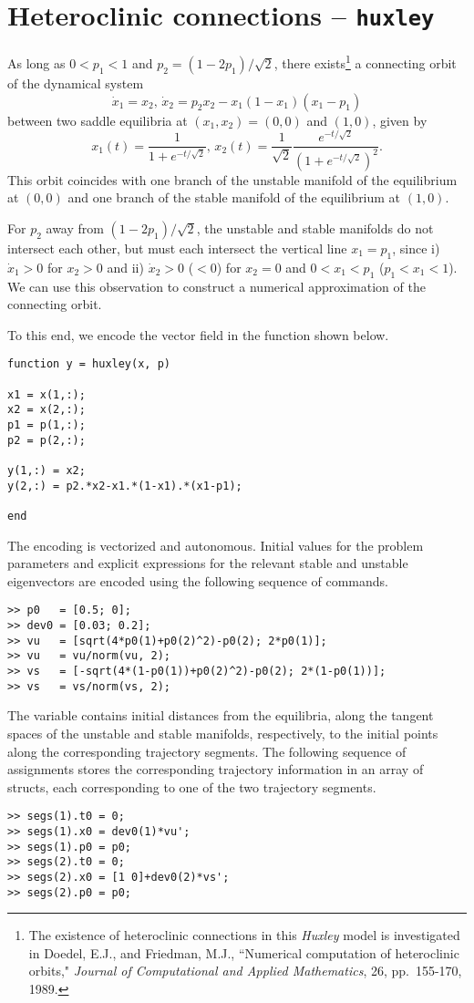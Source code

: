 \section{Heteroclinic connections -- \texttt{huxley}}
As long as $0<p_1<1$ and $p_2=(1-2p_1)/\sqrt{2}$, there exists\footnote{The existence of heteroclinic connections in this \emph{Huxley} model is investigated in Doedel, E.J., and Friedman, M.J., ``Numerical computation of heteroclinic orbits," \emph{Journal of Computational and Applied Mathematics}, 26, pp.~155-170, 1989.} a connecting orbit of the dynamical system
\begin{equation}
\dot{x}_1=x_2,\,\dot{x}_2=p_2 x_2-x_1(1-x_1)(x_1-p_1)
\end{equation}
between two saddle equilibria at $(x_1,x_2)=(0,0)$ and $(1,0)$, given by
\begin{equation}
x_1(t)=\frac{1}{1+e^{-t/\sqrt{2}}},\,x_2(t)=\frac{1}{\sqrt{2}}\frac{e^{-t/\sqrt{2}}}{(1+e^{-t/\sqrt{2}})^2}.
\end{equation}
This orbit coincides with one branch of the unstable manifold of the equilibrium at $(0,0)$ and one branch of the stable manifold of the equilibrium at $(1,0)$.

For $p_2$ away from $(1-2p_1)/\sqrt{2}$, the unstable and stable manifolds do not intersect each other, but must each intersect the vertical line $x_1=p_1$, since i) $\dot{x}_1>0$ for $x_2>0$ and ii) $\dot{x}_2>0$ ($<0$) for $x_2=0$ and $0<x_1<p_1$ ($p_1<x_1<1$). We can use this observation to construct a numerical approximation of the connecting orbit.

To this end, we encode the vector field in the function  shown below.
\begin{lstlisting}[language=coco-highlight]
function y = huxley(x, p)

x1 = x(1,:);
x2 = x(2,:);
p1 = p(1,:);
p2 = p(2,:);

y(1,:) = x2;
y(2,:) = p2.*x2-x1.*(1-x1).*(x1-p1);

end
\end{lstlisting}
The encoding is vectorized and autonomous. Initial values for the problem parameters and explicit expressions for the relevant stable and unstable eigenvectors are encoded using the following sequence of commands.
\begin{lstlisting}[language=coco-highlight]
>> p0   = [0.5; 0];
>> dev0 = [0.03; 0.2];
>> vu   = [sqrt(4*p0(1)+p0(2)^2)-p0(2); 2*p0(1)];
>> vu   = vu/norm(vu, 2);
>> vs   = [-sqrt(4*(1-p0(1))+p0(2)^2)-p0(2); 2*(1-p0(1))];
>> vs   = vs/norm(vs, 2);
\end{lstlisting}
The  variable contains initial distances from the equilibria, along the tangent spaces of the unstable and stable manifolds, respectively, to the initial points along the corresponding trajectory segments. The following sequence of assignments stores the corresponding trajectory information in an array of structs, each corresponding to one of the two trajectory segments.
\begin{lstlisting}[language=coco-highlight]
>> segs(1).t0 = 0;
>> segs(1).x0 = dev0(1)*vu';
>> segs(1).p0 = p0;
>> segs(2).t0 = 0;
>> segs(2).x0 = [1 0]+dev0(2)*vs';
>> segs(2).p0 = p0;
\end{lstlisting}

